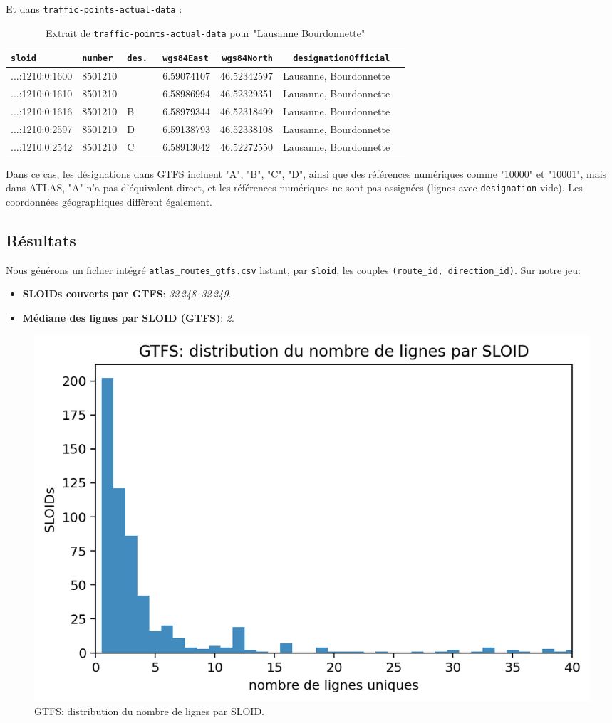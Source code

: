 Et dans \texttt{traffic-points-actual-data} :

\begin{table}[H]
\caption{Extrait de \texttt{traffic-points-actual-data} pour "Lausanne Bourdonnette"}
\label{tab:traffic_bourdonnette_2}
\centering
\begin{tabular}{l l l l r r l}
\toprule
\texttt{sloid} & \texttt{number} & \texttt{des.
}  & \texttt{wgs84East} & \texttt{wgs84North} & \texttt{designationOfficial} \\
\midrule
...:1210:0:1600 & 8501210 &  & 6.59074107 & 46.52342597 & Lausanne, Bourdonnette \\
...:1210:0:1610 & 8501210 &  & 6.58986994 & 46.52329351 & Lausanne, Bourdonnette \\
...:1210:0:1616 & 8501210 & B & 6.58979344 & 46.52318499 & Lausanne, Bourdonnette \\
...:1210:0:2597 & 8501210 & D & 6.59138793 & 46.52338108 & Lausanne, Bourdonnette \\
...:1210:0:2542 & 8501210 & C & 6.58913042 & 46.52272550 & Lausanne, Bourdonnette \\
\bottomrule
\end{tabular}
\end{table}

Dans ce cas, les désignations dans GTFS incluent "A", "B", "C", "D", ainsi que des références numériques comme "10000" et "10001", mais dans ATLAS,  "A" n’a pas d’équivalent direct, et les références numériques ne sont pas assignées (lignes avec \texttt{designation} vide). Les coordonnées géographiques diffèrent également.

\subsection{Résultats}
Nous générons un fichier intégré \texttt{atlas\_routes\_gtfs.csv} listant, par \texttt{sloid}, les couples \texttt{(route\_id, direction\_id)}. Sur notre jeu:
\begin{itemize}
  \item \textbf{SLOIDs couverts par GTFS}: \textit{32\,248--32\,249}.
  \item \textbf{Médiane des lignes par SLOID (GTFS)}: \textit{2}.
\end{itemize}

\begin{figure}[h]
  \centering
  \includegraphics[width=.7\linewidth]{figures/plots/gtfs_routes_per_sloid.png}
  \caption[GTFS: lignes par SLOID]{GTFS: distribution du nombre de lignes par SLOID.}
  \label{fig:gtfs_lines_per_sloid}
\end{figure}

